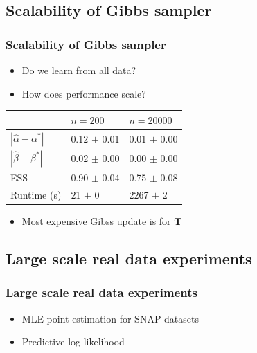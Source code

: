 \documentclass[final,hyperref={pdfpagelabels=false},noamsthm]{beamer}
\newcommand{\bfT}{\mathbf{T}}
\begin{document}
\subsection{Scalability of Gibbs sampler}
\begin{frame}
	\frametitle{Scalability of Gibbs sampler}
	\begin{itemize}
		\item Do we learn from all data?
		\item How does performance scale?
	\end{itemize}
	\pause
	
	\begin{table}[t]
		\label{tab:ess:scale:n}
		\vspace*{-0.25\baselineskip}
		\begin{center}
			\begin{tabular}{l  ll}
				& $n=200$ &  $n=20000$ \\ 
				\hline
				$|\hat{\alpha} - \alpha^*|$ & 0.12 $\pm$ 0.01 &  0.01 $\pm$ 0.00 \\ 
				
				$|\hat{\beta} - \beta^*|$ &  0.02 $\pm$ 0.00  &    0.00 $\pm$ 0.00  \\ 
				
				ESS &  0.90 $\pm$ 0.04  &   0.75 $\pm$ 0.08  \\  
				
				Runtime (s) &  21 $\pm$ 0   &  2267 $\pm$ 2  \\ 
				
			\end{tabular}
		\end{center}
	\end{table}
	\begin{itemize}
		\item Most expensive Gibss update is for $\bfT$
	\end{itemize}
\end{frame}

\subsection{Large scale real data experiments}
\begin{frame}
	\frametitle{Large scale real data experiments}
	\begin{itemize}
		\item MLE point estimation for SNAP datasets
		\item Predictive log-likelihood
	\end{itemize}
	
\end{frame}
\end{document}
